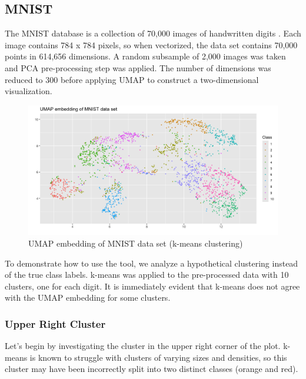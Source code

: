 \documentclass{article}
\begin{document}
\subsection{MNIST}
The MNIST database is a collection of 70,000 images of handwritten digits \cite{MNIST}. Each image contains 784 x 784 pixels, so when vectorized, the data set contains 70,000 points in 614,656 dimensions. A random subsample of 2,000 images was taken and PCA pre-processing step was applied. The number of dimensions was reduced to 300 before applying UMAP to construct a two-dimensional visualization.

\renewcommand{\figurename}{Figure}
\renewcommand{\thefigure}{2}
\begin{figure}[t]
\centering
\includegraphics[scale=0.43]{MNIST kmeans}
\caption{UMAP embedding of MNIST data set (k-means clustering)}
\end{figure}

 To demonstrate how to use the tool, we analyze a hypothetical clustering instead of the true class labels. k-means was applied to the pre-processed data with 10 clusters,  one for each digit. It is immediately evident that k-means does not agree with the UMAP embedding for some clusters.
 
 \subsubsection{Upper Right Cluster}
 
Let's begin by investigating the cluster in the upper right corner of the plot. k-means is known to struggle with clusters of varying sizes and densities, so this cluster may have been incorrectly split into two distinct classes (orange and red).
\end{document}
